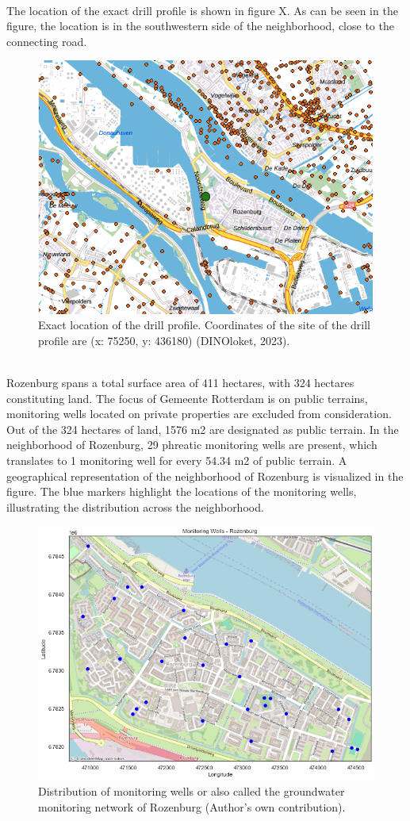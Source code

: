 \\
The location of the exact drill profile is shown in figure X. As can be seen in the figure, the location is in the southwestern side of the neighborhood, close to the connecting road. 
\\
\begin{figure}[htbp]
    \centering
    \includegraphics[width=0.60\linewidth]{figures/roz/drillsite.png}
    \caption{Exact location of the drill profile. Coordinates of the site of the drill profile are (x: 75250, y: 436180) (DINOloket, 2023).}
\end{figure}
\\
Rozenburg spans a total surface area of 411 hectares, with 324 hectares constituting land. The focus of Gemeente Rotterdam is on public terrains, monitoring wells located on private properties are excluded from consideration. Out of the 324 hectares of land, 1576 m2 are designated as public terrain. In the neighborhood of Rozenburg, 29 phreatic monitoring wells are present, which translates to 1 monitoring well for every  54.34 m2 of public terrain. A geographical representation of the neighborhood of Rozenburg is visualized in the figure. The blue markers highlight the locations of the monitoring wells, illustrating the distribution across the neighborhood.

\begin{figure}[htbp]
    \centering
    \includegraphics[width=0.55\linewidth]{figures/roz/basic_roz.png}
    \caption{Distribution of monitoring wells or also called the groundwater monitoring network of Rozenburg (Author's own contribution).}
\end{figure}

